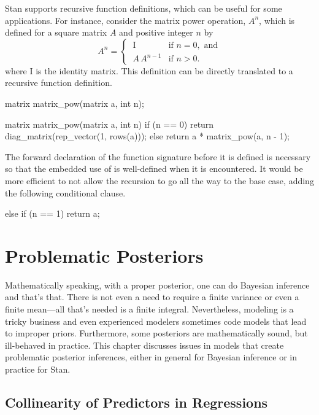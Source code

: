 Stan supports recursive function definitions, which can be useful for
some applications.  For instance, consider the matrix power operation,
$A^n$, which is defined for a square matrix $A$ and positive integer
$n$ by
\[
A^n
=
\begin{cases}
\ \mbox{I} & \mbox{if } n = 0, \mbox{ and}
\\[3pt]
\ A \, A^{n-1} & \mbox{if } n > 0.
\end{cases}
\]
%
where $\mbox{I}$ is the identity matrix.  This definition can be
directly translated to a recursive function definition.
%
\begin{stancode}
  matrix matrix_pow(matrix a, int n);

  matrix matrix_pow(matrix a, int n) {
    if (n == 0)
      return diag_matrix(rep_vector(1, rows(a)));
    else
      return a *  matrix_pow(a, n - 1);
  }
\end{stancode}
%
The forward declaration of the function signature before it is defined
is necessary so that the embedded use of  is
well-defined when it is encountered.  It would be more efficient to
not allow the recursion to go all the way to the base case, adding the
following conditional clause.
%
\begin{stancode}
    else if (n == 1)
      return a;
\end{stancode}



\chapter{Problematic Posteriors}\label{problematic-posteriors.chapter}%

\noindent
Mathematically speaking, with a proper posterior, one can do Bayesian
inference and that's that. There is not even a need to require a
finite variance or even a finite mean---all that's needed is a finite
integral.  Nevertheless, modeling is a tricky business and even
experienced modelers sometimes code models that lead to improper
priors.  Furthermore, some posteriors are mathematically sound, but
ill-behaved in practice.  This chapter discusses issues in models that
create problematic posterior inferences, either in general for
Bayesian inference or in practice for Stan.


\section{Collinearity of Predictors in Regressions}\label{collinearity.section}

